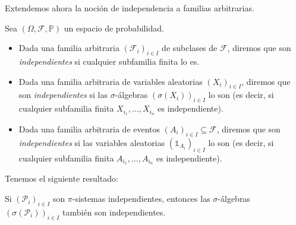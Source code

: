 
Extendemos ahora la noción de independencia a familias arbitrarias.

\begin{definition}
Sea $(\Omega, \mathcal{F}, \mathbb{P})$ un espacio de probabilidad.
\begin{itemize}
  \item Dada una familia arbitraria $(\mathcal{F}_i)_{i\in I}$ de subclases de $\mathcal{F}$, diremos que son \textit{independientes} si cualquier subfamilia finita lo es.
  \item Dada una familia arbitraria de variables aleatorias $(X_i)_{i\in I}$, diremos que son \textit{independientes} si las $\sigma$-álgebras $(\sigma(X_i))_{i\in I}$ lo son (es decir, si cualquier subfamilia finita $X_{i_1},\dots,X_{i_n}$ es independiente).
  \item Dada una familia arbitraria de eventos $(A_i)_{i\in I} \subseteq \mathcal{F}$, diremos que son \textit{independientes} si las variables aleatorias $(\mathds{1}_{A_i})_{i\in I}$ lo son (es decir, si cualquier subfamilia finita $A_{i_1},\dots,A_{i_n}$ es independiente).
\end{itemize}
\end{definition}
\medskip \par
Tenemos el siguiente resultado:

\begin{theorem}
Si $(\mathcal{P}_i)_{i\in I}$ son $\pi$-sistemas independientes, entonces las $\sigma$-álgebras $(\sigma(\mathcal{P}_i))_{i\in I}$ también son independientes.
\end{theorem}

